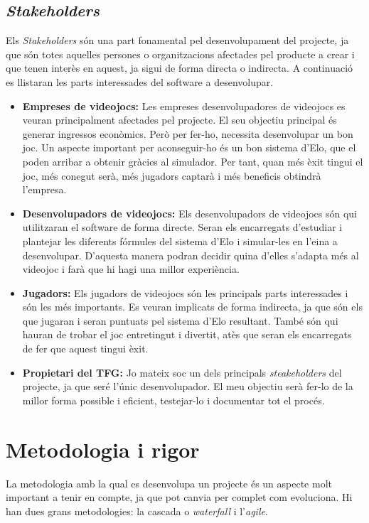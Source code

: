 \documentclass[a4paper]{article}
\begin{document}
\subsection{\textit{Stakeholders}}
Els \textit{Stakeholders} són una part fonamental pel desenvolupament del projecte, ja que són totes aquelles persones o organitzacions afectades pel producte a crear i que tenen interès en aquest, ja sigui de forma directa o indirecta. A continuació es llistaran les parts interessades del software a desenvolupar.

\begin{itemize}
    \item \textbf{Empreses de videojocs:} Les empreses desenvolupadores de videojocs es veuran principalment afectades pel projecte. El seu objectiu principal és generar ingressos econòmics. Però per fer-ho, necessita desenvolupar un bon joc. Un aspecte important per aconseguir-ho és un bon sistema d'Elo, que el poden arribar a obtenir gràcies al simulador. Per tant, quan més èxit tingui el joc, més conegut serà, més jugadors captarà i més beneficis obtindrà l'empresa.
    
    \item \textbf{Desenvolupadors de videojocs:} Els desenvolupadors de videojocs són qui utilitzaran el software de forma directe. Seran els encarregats d'estudiar i plantejar les diferents fórmules del sistema d'Elo i simular-les en l'eina a desenvolupar. D'aquesta manera podran decidir quina d'elles s'adapta més al videojoc i farà que hi hagi una millor experiència.
    
    \item \textbf{Jugadors:} Els jugadors de videojocs són les principals parts interessades i són les més importants. Es veuran implicats de forma indirecta, ja que són els que jugaran i seran puntuats pel sistema d'Elo resultant. També són qui hauran de trobar el joc entretingut i divertit, atès que seran els encarregats de fer que aquest tingui èxit. 
    
    \item \textbf{Propietari del TFG:} Jo mateix soc un dels principals \textit{steakeholders} del projecte, ja que seré l'únic desenvolupador. El meu objectiu serà fer-lo de la millor forma possible i eficient, testejar-lo i documentar tot el procés.
    
\end{itemize}

\newpage
\section{Metodologia i rigor}
La metodologia amb la qual es desenvolupa un projecte és un aspecte molt important a tenir en compte, ja que pot canvia per complet com evoluciona. Hi han dues grans metodologies: la cascada o \textit{waterfall} i l'\textit{agile}.
\end{document}
